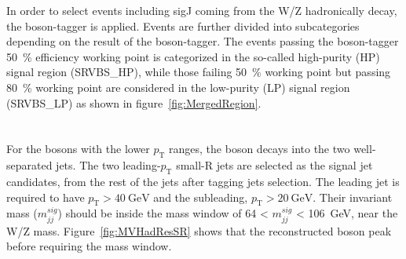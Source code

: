 In order to select events including sigJ coming from the W/Z hadronically decay, the boson-tagger is applied. Events are further divided into subcategories depending on the result of the boson-tagger. The events passing the boson-tagger 50~\% efficiency working point is categorized in the so-called high-purity (HP) signal region (SRVBS\_HP), while those failing 50~\% working point but passing 80~\% working point are considered in the low-purity (LP) signal region (SRVBS\_LP) as shown in figure~\ref{fig:MergedRegion}. \\ \\ 

\noindent\textbf{}  \\
For the bosons with the lower $p_\mathrm{T}$ ranges, the boson decays into the two well-separated jets. The two leading-$p_\mathrm{T}$ small-R jets are selected as the signal jet candidates, from the rest of the jets after tagging jets selection. 
The leading jet is required to have $p_\mathrm{T} > 40~\mathrm{GeV}$ and the subleading, $p_\mathrm{T} > 20~\mathrm{GeV}$. Their invariant mass ($m^{sig}_{jj}$) should be inside the mass window of 64 < $m^{sig}_{jj}$ < 106~GeV, near the W/Z mass. Figure~\ref{fig:MVHadResSR} shows that the reconstructed boson peak before requiring the mass window.


